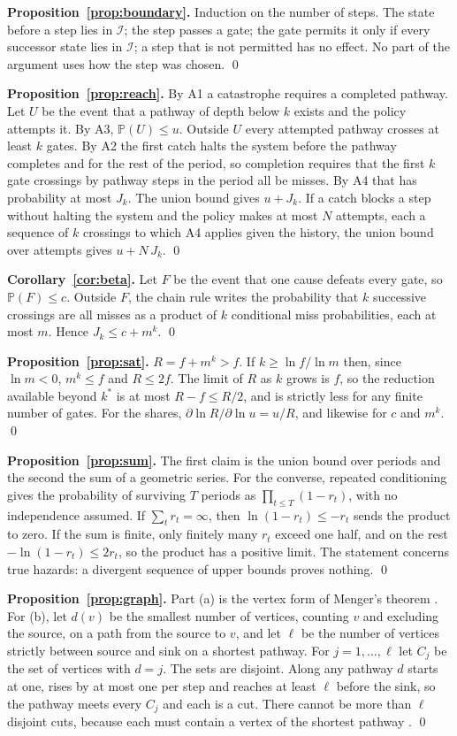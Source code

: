 \documentclass[10pt,twocolumn,letterpaper]{article}
\theoremstyle{definition}
\newcommand{\Pb}{\mathbb{P}}
\newcommand{\Inv}{\mathcal{I}}
\begin{document}
\textbf{Proposition~\ref{prop:boundary}.} Induction on the number of steps. The state before a step lies in $\Inv$; the step passes a gate; the gate permits it only if every successor state lies in $\Inv$; a step that is not permitted has no effect. No part of the argument uses how the step was chosen. \qed

\textbf{Proposition~\ref{prop:reach}.} By A1 a catastrophe requires a completed pathway. Let $U$ be the event that a pathway of depth below $k$ exists and the policy attempts it. By A3, $\Pb(U)\le u$. Outside $U$ every attempted pathway crosses at least $k$ gates. By A2 the first catch halts the system before the pathway completes and for the rest of the period, so completion requires that the first $k$ gate crossings by pathway steps in the period all be misses. By A4 that has probability at most $J_{k}$. The union bound gives $u+J_{k}$. If a catch blocks a step without halting the system and the policy makes at most $N$ attempts, each a sequence of $k$ crossings to which A4 applies given the history, the union bound over attempts gives $u+N\,J_{k}$. \qed

\textbf{Corollary~\ref{cor:beta}.} Let $F$ be the event that one cause defeats every gate, so $\Pb(F)\le c$. Outside $F$, the chain rule writes the probability that $k$ successive crossings are all misses as a product of $k$ conditional miss probabilities, each at most $m$. Hence $J_{k}\le c+m^{k}$. \qed

\textbf{Proposition~\ref{prop:sat}.} $R=f+m^{k}>f$. If $k\ge\ln f/\ln m$ then, since $\ln m<0$, $m^{k}\le f$ and $R\le 2f$. The limit of $R$ as $k$ grows is $f$, so the reduction available beyond $k^{*}$ is at most $R-f\le R/2$, and is strictly less for any finite number of gates. For the shares, $\partial\ln R/\partial\ln u=u/R$, and likewise for $c$ and $m^{k}$. \qed

\textbf{Proposition~\ref{prop:sum}.} The first claim is the union bound over periods and the second the sum of a geometric series. For the converse, repeated conditioning gives the probability of surviving $T$ periods as $\prod_{t\le T}(1-r_{t})$, with no independence assumed. If $\sum_{t}r_{t}=\infty$, then $\ln(1-r_{t})\le-r_{t}$ sends the product to zero. If the sum is finite, only finitely many $r_{t}$ exceed one half, and on the rest $-\ln(1-r_{t})\le 2r_{t}$, so the product has a positive limit. The statement concerns true hazards: a divergent sequence of upper bounds proves nothing. \qed

\textbf{Proposition~\ref{prop:graph}.} Part (a) is the vertex form of Menger's theorem \cite{menger,ford}. For (b), let $d(v)$ be the smallest number of vertices, counting $v$ and excluding the source, on a path from the source to $v$, and let $\ell$ be the number of vertices strictly between source and sink on a shortest pathway. For $j=1,\dots,\ell$ let $C_{j}$ be the set of vertices with $d=j$. The sets are disjoint. Along any pathway $d$ starts at one, rises by at most one per step and reaches at least $\ell$ before the sink, so the pathway meets every $C_{j}$ and each is a cut. There cannot be more than $\ell$ disjoint cuts, because each must contain a vertex of the shortest pathway \cite{robacker}. \qed
\end{document}
